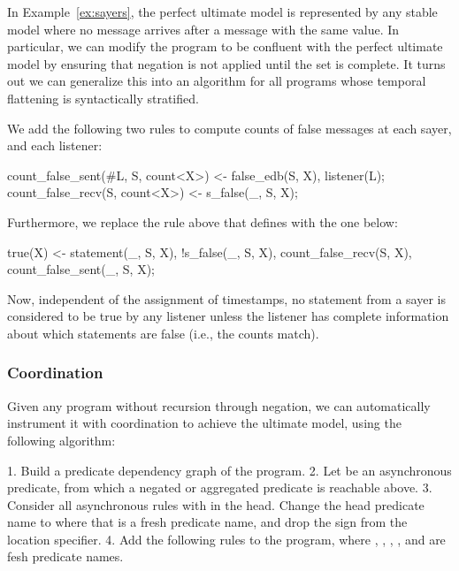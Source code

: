 In Example~\ref{ex:sayers}, the perfect ultimate model is represented by any stable model where no  message arrives after a  message with the same value.  In particular, we can modify the program to be confluent with the perfect ultimate model by ensuring that negation is not applied until the  set is complete.  It turns out we can generalize this into an algorithm for all \lang programs whose temporal flattening is syntactically stratified.

We add the following two rules to compute counts of false messages at each sayer, and each listener:

\begin{Dedalus}
count_false_sent(#L, S, count<X>) <- false_edb(S, X),
                                     listener(L);
count_false_recv(S, count<X>) <- s_false(_, S, X);
\end{Dedalus}

Furthermore, we replace the rule above that defines  with the one below:

\begin{Dedalus}
true(X) <- statement(_, S, X), !s_false(_, S, X),
           count_false_recv(S, X),
           count_false_sent(_, S, X);
\end{Dedalus}

Now, independent of the assignment of timestamps, no statement from a sayer  is considered to be true by any listener unless the listener has complete information about which statements are false (i.e., the counts match). 



\subsubsection{Coordination}
Given any \lang program without recursion through negation, we can automatically instrument it with coordination to achieve the ultimate model, using the following algorithm:

1. Build a predicate dependency graph of the program. 
2. Let  be an asynchronous predicate, from which a negated or aggregated predicate is reachable above.
3. Consider all asynchronous rules with  in the head.  Change the head predicate name to  where that is a fresh predicate name, and drop the \dedalus{\#} sign from the location specifier.
4. Add the following rules to the program, where , , , , and  are fesh predicate names.

